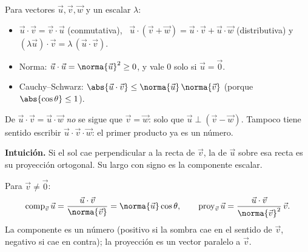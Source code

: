 \documentclass[11pt,a4paper]{article}
\let\nivelbase\nivel
\renewcommand{\nivel}[2]{\Needspace{8\baselineskip}\nivelbase{#1}{#2}}
\newcommand{\proy}{\operatorname{proy}}
\newcommand{\comp}{\operatorname{comp}}
\newcommand{\vu}{\vec{u}}\def\vv{\vec{v}}\newcommand{\vw}{\vec{w}}\newcommand{\vn}{\vec{n}}
\begin{document}
\begin{propiedad}
Para vectores $\vu,\vv,\vw$ y un escalar $\lambda$:
\begin{itemize}
\item $\vu\cdot\vv=\vv\cdot\vu$ (conmutativa), \ $\vu\cdot(\vv+\vw)=\vu\cdot\vv+\vu\cdot\vw$ (distributiva) y
      $(\lambda\vu)\cdot\vv=\lambda\,(\vu\cdot\vv)$.
\item Norma: $\vu\cdot\vu=\norma{\vu}^2\ge0$, y vale $0$ solo si $\vu=\vec 0$.
\item Cauchy--Schwarz: $\abs{\vu\cdot\vv}\le\norma{\vu}\,\norma{\vv}$ (porque $\abs{\cos\theta}\le1$).
\end{itemize}
\end{propiedad}
\begin{ojo}
De $\vu\cdot\vv=\vu\cdot\vw$ \emph{no} se sigue que $\vv=\vw$: solo que $\vu\perp(\vv-\vw)$. Tampoco tiene
sentido escribir $\vu\cdot\vv\cdot\vw$: el primer producto ya es un número.
\end{ojo}


\textbf{Intuición.} Si el sol cae perpendicular a la recta de $\vv$, la  de $\vu$ sobre esa recta es
su proyección ortogonal. Su largo con signo es la componente escalar.

\begin{definicion}
Para $\vv\neq\vec 0$:
\[ \comp_{\vv}\vu=\frac{\vu\cdot\vv}{\norma{\vv}}=\norma{\vu}\cos\theta,
\qquad
\proy_{\vv}\vu=\frac{\vu\cdot\vv}{\norma{\vv}^2}\,\vv . \]
La componente es un número (positivo si la sombra cae en el sentido de $\vv$, negativo si cae en contra);
la proyección es un vector paralelo a $\vv$.
\end{definicion}
\end{document}
